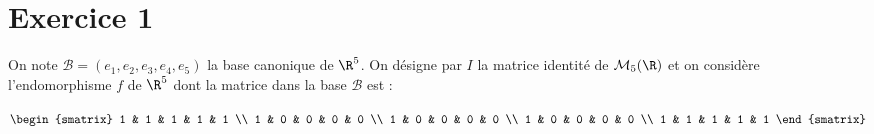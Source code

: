 \documentclass[11pt]{article}%
\begin{document}
\indent \vspace{0.3cm}


\vspace{0.5cm}

\section*{Exercice 1}

\noindent On note $\mathcal{B} = (e_{1},e_{2},e_{3},e_{4},e_{5})$ la
base canonique de $\R^{5}$. On désigne par $I$ la matrice identité de
$\mathcal{M}_{5} (\R)$ et on considère l'endomorphisme $f$ de $\R^{5}$
dont la matrice dans la base $\mathcal{B}$ est :

\begin{center}
$\begin{smatrix}
1 & 1 & 1 & 1 & 1 \\
1 & 0 & 0 & 0 & 0 \\
1 & 0 & 0 & 0 & 0 \\
1 & 0 & 0 & 0 & 0 \\
1 & 1 & 1 & 1 & 1
\end{smatrix}
$
\end{center}
\end{document}
